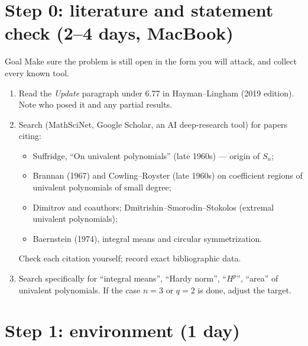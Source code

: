 \documentclass[11pt]{article}
\begin{document}
\section{Step 0: literature and statement check (2--4 days, MacBook)}

\begin{goal}{Goal}
Make sure the problem is still open in the form you will attack, and collect every known tool.
\end{goal}
\begin{enumerate}[leftmargin=*]
\item Read the \emph{Update} paragraph under 6.77 in Hayman--Lingham (2019 edition). Note who posed it and any partial results.
\item Search (MathSciNet, Google Scholar, an AI deep-research tool) for papers citing:
  \begin{itemize}[nosep]
  \item Suffridge, ``On univalent polynomials'' (late 1960s) --- origin of $S_n$;
  \item Brannan (1967) and Cowling--Royster (late 1960s) on coefficient regions of univalent polynomials of small degree;
  \item Dimitrov and coauthors; Dmitrishin--Smorodin--Stokolos (extremal univalent polynomials);
  \item Baernstein (1974), integral means and circular symmetrization.
  \end{itemize}
  Check each citation yourself; record exact bibliographic data.
\item Search specifically for ``integral means'', ``Hardy norm'', ``$H^p$'', ``area'' of univalent polynomials. If the case $n=3$ or $q=2$ is done, adjust the target.
\end{enumerate}

\section{Step 1: environment (1 day)}
\end{document}
